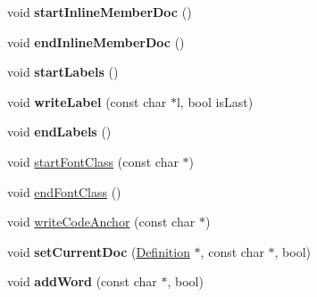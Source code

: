 \begin{DoxyCompactItemize}
\item 
\mbox{\label{class_r_t_f_generator_af4b8acfdf0cb5e33d0760a6bdde6322d}} 
void {\bfseries start\+Inline\+Member\+Doc} ()
\item 
\mbox{\label{class_r_t_f_generator_a20f66586492ba04de6f0a6c57e4aefa6}} 
void {\bfseries end\+Inline\+Member\+Doc} ()
\item 
\mbox{\label{class_r_t_f_generator_a7ac65450689663a29331090a1329ea75}} 
void {\bfseries start\+Labels} ()
\item 
\mbox{\label{class_r_t_f_generator_a21da1a74e7ed943dc3cf613ecd23791f}} 
void {\bfseries write\+Label} (const char $\ast$l, bool is\+Last)
\item 
\mbox{\label{class_r_t_f_generator_a05613171c01f474ba7684b7ef619421e}} 
void {\bfseries end\+Labels} ()
\item 
void \mbox{\hyperlink{class_r_t_f_generator_a84114371fc0f3865e0321c2df8ce0ae9}{start\+Font\+Class}} (const char $\ast$)
\item 
void \mbox{\hyperlink{class_r_t_f_generator_a8753e9a10c126e0f8b9af7ff9783afcd}{end\+Font\+Class}} ()
\item 
void \mbox{\hyperlink{class_r_t_f_generator_a01b1cb771ecbdb9da62b21c980d1a5ae}{write\+Code\+Anchor}} (const char $\ast$)
\item 
\mbox{\label{class_r_t_f_generator_a38af98ffc41789449c0204dcde02b7dd}} 
void {\bfseries set\+Current\+Doc} (\mbox{\hyperlink{class_definition}{Definition}} $\ast$, const char $\ast$, bool)
\item 
\mbox{\label{class_r_t_f_generator_af386b517dfdb4b5b5c02cfd2bae5761e}} 
void {\bfseries add\+Word} (const char $\ast$, bool)
\end{DoxyCompactItemize}
